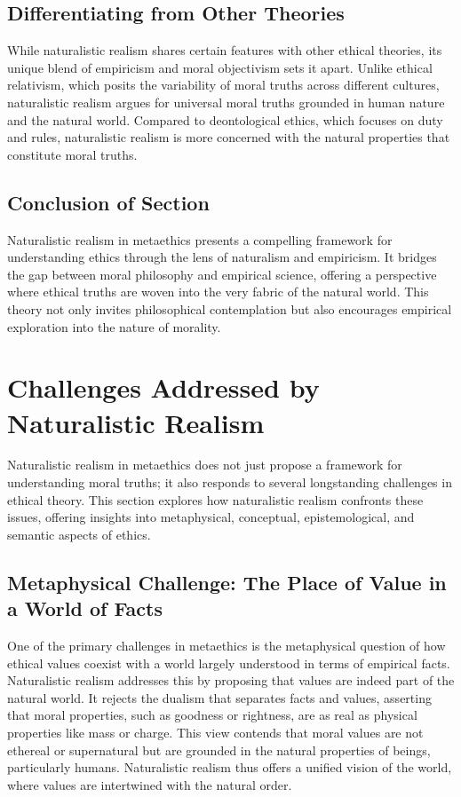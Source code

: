\documentclass[12pt,a4paper]{article}
\begin{document}
\subsection{Differentiating from Other Theories}
While naturalistic realism shares certain features with other ethical theories, its unique blend of empiricism and moral objectivism sets it apart. Unlike ethical relativism, which posits the variability of moral truths across different cultures, naturalistic realism argues for universal moral truths grounded in human nature and the natural world. Compared to deontological ethics, which focuses on duty and rules, naturalistic realism is more concerned with the natural properties that constitute moral truths.

\subsection{Conclusion of Section}
Naturalistic realism in metaethics presents a compelling framework for understanding ethics through the lens of naturalism and empiricism. It bridges the gap between moral philosophy and empirical science, offering a perspective where ethical truths are woven into the very fabric of the natural world. This theory not only invites philosophical contemplation but also encourages empirical exploration into the nature of morality.

\section{Challenges Addressed by Naturalistic Realism}

Naturalistic realism in metaethics does not just propose a framework for understanding moral truths; it also responds to several longstanding challenges in ethical theory. This section explores how naturalistic realism confronts these issues, offering insights into metaphysical, conceptual, epistemological, and semantic aspects of ethics.

\subsection{Metaphysical Challenge: The Place of Value in a World of Facts}
One of the primary challenges in metaethics is the metaphysical question of how ethical values coexist with a world largely understood in terms of empirical facts. Naturalistic realism addresses this by proposing that values are indeed part of the natural world. It rejects the dualism that separates facts and values, asserting that moral properties, such as goodness or rightness, are as real as physical properties like mass or charge. This view contends that moral values are not ethereal or supernatural but are grounded in the natural properties of beings, particularly humans. Naturalistic realism thus offers a unified vision of the world, where values are intertwined with the natural order.
\end{document}
